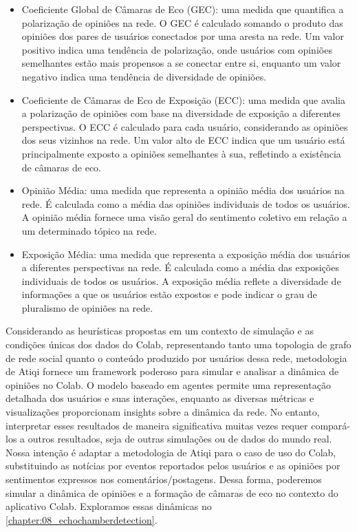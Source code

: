 \begin{itemize}
	\item Coeficiente Global de Câmaras de Eco (GEC): uma medida que quantifica a polarização de opiniões na rede. O GEC é calculado somando o produto das opiniões dos pares de usuários conectados por uma aresta na rede. Um valor positivo indica uma tendência de polarização, onde usuários com opiniões semelhantes estão mais propensos a se conectar entre si, enquanto um valor negativo indica uma tendência de diversidade de opiniões.
	\item Coeficiente de Câmaras de Eco de Exposição (ECC): uma medida que avalia a polarização de opiniões com base na diversidade de exposição a diferentes perspectivas. O ECC é calculado para cada usuário, considerando as opiniões dos seus vizinhos na rede. Um valor alto de ECC indica que um usuário está principalmente exposto a opiniões semelhantes à sua, refletindo a existência de câmaras de eco.
	\item Opinião Média: uma medida que representa a opinião média dos usuários na rede. É calculada como a média das opiniões individuais de todos os usuários. A opinião média fornece uma visão geral do sentimento coletivo em relação a um determinado tópico na rede.
	\item Exposição Média: uma medida que representa a exposição média dos usuários a diferentes perspectivas na rede. É calculada como a média das exposições individuais de todos os usuários. A exposição média reflete a diversidade de informações a que os usuários estão expostos e pode indicar o grau de pluralismo de opiniões na rede.
\end{itemize}

Considerando as heurísticas propostas em um contexto de simulação e as condições únicas dos dados do Colab, representando tanto uma topologia de grafo de rede social quanto o conteúdo produzido por usuários dessa rede, metodologia de Atiqi fornece um framework poderoso para simular e analisar a dinâmica de opiniões no Colab. O modelo baseado em agentes permite uma representação detalhada dos usuários e suas interações, enquanto as diversas métricas e visualizações proporcionam insights sobre a dinâmica da rede. No entanto, interpretar esses resultados de maneira significativa muitas vezes requer compará-los a outros resultados, seja de outras simulações ou de dados do mundo real. Nossa intenção é adaptar a metodologia de Atiqi para o caso de uso do Colab, substituindo as notícias por eventos reportados pelos usuários e as opiniões por sentimentos expressos nos comentários/postagens. Dessa forma, poderemos simular a dinâmica de opiniões e a formação de câmaras de eco no contexto do aplicativo Colab. Exploramos essas dinâmicas no \autoref{chapter:08_echochamberdetection}.

